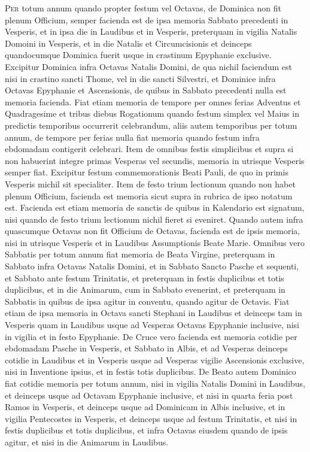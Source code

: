 \begin{multicols*}{2}
{\color{Red} }
\lettrine[lines=2]{\zallmancaps \color{Red} P}{er} totum annum quando propter festum vel Octavas, de Dominica non fit plenum Officium, semper facienda est de ipsa memoria Sabbato precedenti in Vesperis, et in ipsa die in Laudibus et in Vesperis, preterquam in vigilia Natalis Domoini in Vesperis, et in die Natalis et Circumcisionis et deinceps quandocumque Dominica fuerit usque in crastinum Epyphanie exclusive. Excipitur Dominica infra Octavas Natalis Domini, de qua nichil faciendum est nisi in crastino sancti Thome, vel in die sancti Silvestri, et Dominice infra Octavas Epyphanie et Ascensionis, de quibus in Sabbato precedenti nulla est memoria facienda.
Fiat etiam memoria de tempore per omnes ferias
Adventus et Quadragesime et tribus diebus Rogationum quando festum simplex vel Maius in predictis temporibus occurrerit celebrandum, aliis autem temporibus per totum annum, de tempore per ferias nulla fiat memoria quando festum infra ebdomadam contigerit celebrari.
Item de omnibus festis simplicibus et supra si non habuerint integre primas Vesperas vel secundis, memoria in utrisque Vesperis semper fiat. Excipitur festum commemorationis Beati Pauli, de quo in primis Vesperis michil sit specialiter. Item de festo trium lectionum quando non habet plenum Officium, facienda est memoria sicut supra in rubrica de ipso notatum est.
Facienda est etiam memoria de sanctis de quibus in Kalendario est signatum, nisi quando de festo trium lectionum nichil fieret si eveniret. Quando autem infra quascumque Octavas non fit Officium de Octavas, facienda est de ipsis memoria, nisi in utrisque Vesperis et in Laudibus Assumptionis Beate Marie.
Omnibus vero Sabbatis per totum annum fiat memoria de Beata Virgine, preterquam in Sabbato infra Octavas Natalis Domini, et in Sabbato Sancto Pasche et sequenti, et Sabbato ante festum Trinitatis, et preterquam in festis duplicibus et totis duplicibus, et in die Animarum, cum in Sabbato evenerint, et preterquam in Sabbatis in quibus de ipsa agitur in conventu, quando agitur de Octavis.
Fiat etiam de ipsa memoria in Octava sancti Stephani in Laudibus et deinceps tam in Vesperis quam in Laudibus usque ad Vesperas Octavas Epyphanie inclusive, nisi in vigilia et in festo Epyphanie.
De Cruce vero facienda est memoria cotidie per ebdomadam Pasche in Vesperis, et Sabbato in Albis, et ad Vesperas deinceps cotidie in Laudibus et in Vesperis usque ad Vesperas vigilie Ascensionis exclusive, nisi in Inventione ipsius, et in festis totis duplicibus.
De Beato autem Dominico fiat cotidie memoria per totum annum, nisi in vigilia Natalis Domini in Laudibus, et deinceps usque ad Octavam Epyphanie inclusive, et nisi in quarta feria post Ramos in Vesperis, et deinceps usque ad Dominicam in Albis inclusive, et in vigilia Pentecostes in Vesperis, et deinceps usque ad festum Trinitatis, et nisi in festis duplicibus et totis duplicibus, et infra Octavas eiusdem quando de ipsis agitur, et nisi in die Animarum in Laudibus.


\end{multicols*}
